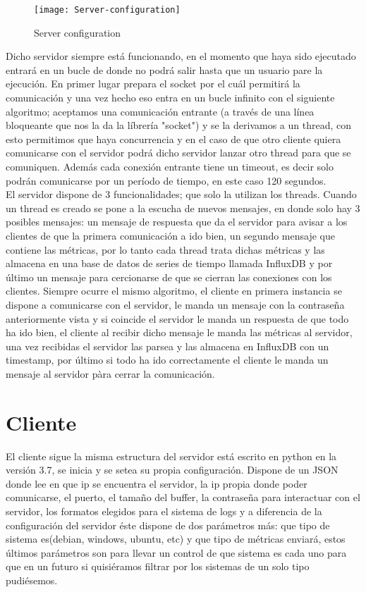 \documentclass[ spanish, a4paper, 12pt, oneside]{report}
\begin{document}
\begin{figure}[!h]
   \centering
   \texttt{[image: Server-configuration]}\\
      \caption{\label{fig: Server configuration} Server configuration}
\end{figure}

Dicho servidor siempre está funcionando, en el momento que haya sido ejecutado entrará en un bucle de donde no podrá salir hasta que un usuario pare la ejecución. 
En primer lugar prepara el socket por el cuál permitirá la comunicación y una vez hecho eso entra en un bucle infinito con el siguiente algoritmo; aceptamos una comunicación 
entrante (a través de una línea bloqueante que nos la da la líbrería "socket") y se la derivamos a un thread, con esto permitimos que haya concurrencia y en el caso de que 
otro cliente quiera comunicarse con el servidor podrá dicho servidor lanzar otro thread para que se comuniquen. Además cada conexión entrante tiene un timeout, es decir solo podrán 
comunicarse por un período de tiempo, en este caso 120 segundos. \\

El servidor dispone de 3 funcionalidades; que solo la utilizan los threads. Cuando un thread es creado se pone a la escucha de nuevos mensajes, en donde solo hay 3 posibles mensajes: un mensaje 
de respuesta que da el servidor para avisar a los clientes de que la primera comunicación a ido bien, un segundo mensaje que contiene las métricas, por lo tanto cada thread trata dichas métricas 
y las almacena en una base de datos de series de tiempo llamada InfluxDB y por último un mensaje para cercionarse de que se cierran las conexiones con los clientes. Siempre ocurre el mismo algoritmo, 
el cliente en primera instancia se dispone a comunicarse con el servidor, le manda un mensaje con la contraseña anteriormente vista y si coincide el servidor le manda un respuesta de que todo ha ido 
bien, el cliente al recibir dicho mensaje le manda las métricas al servidor, una vez recibidas el servidor las parsea y las almacena en InfluxDB con un timestamp, por último si todo ha ido correctamente 
el cliente le manda un mensaje al servidor pàra cerrar la comunicación. \\ 


\section{Cliente}
El cliente sigue la misma estructura del servidor está escrito en python en la versión 3.7, se inicia y se setea su propia configuración. Dispone de un JSON donde lee en que ip se encuentra el servidor, la ip propia donde poder comunicarse, el puerto, 
el tamaño del buffer, la contraseña para interactuar con el servidor, los formatos elegidos para el sistema de logs y a diferencia de la configuración del servidor éste dispone de dos parámetros más: que tipo 
de sistema es(debian, windows, ubuntu, etc) y que tipo de métricas enviará, estos últimos parámetros son para llevar un control de que sistema es cada uno para que en un futuro si quisiéramos filtrar por los sistemas 
de un solo tipo pudiésemos. \\
\end{document}
